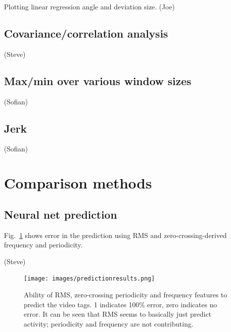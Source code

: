 \documentclass{article}
\begin{document}
Plotting linear regression angle and deviation size. (Joe)

\subsection{Covariance/correlation analysis}

(Steve)

\subsection{Max/min over various window sizes}

(Sofian)

\subsection{Jerk}

(Sofian)

\section{Comparison methods}

\subsection{Neural net prediction}

Fig.~\ref{fig:predresults} shows error in the prediction using RMS and
zero-crossing-derived frequency and periodicity.

(Steve)

\begin{figure}
\centerline{\texttt{[image: images/predictionresults.png]}}
\caption{Ability of RMS, zero-crossing periodicity and frequency
  features to predict the video tags.  1 indicates 100\% error, zero
  indicates no error.  It can be seen that RMS seems to basically just
  predict activity; periodicity and frequency are not contributing.}
\label{fig:predresults}
\end{figure}
\end{document}
